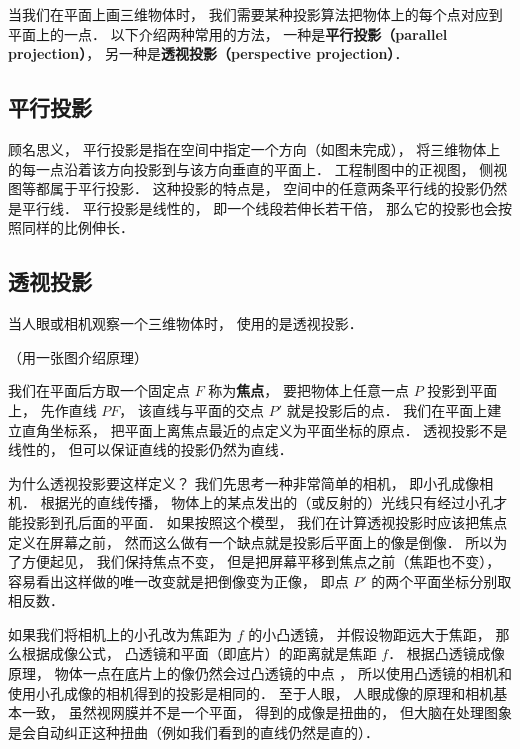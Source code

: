 

当我们在平面上画三维物体时， 我们需要某种投影算法把物体上的每个点对应到平面上的一点． 以下介绍两种常用的方法， 一种是\textbf{平行投影（parallel projection）}， 另一种是\textbf{透视投影（perspective projection）}．


\subsection{平行投影}
顾名思义， 平行投影是指在空间中指定一个方向（如图未完成）， 将三维物体上的每一点沿着该方向投影到与该方向垂直的平面上． 工程制图中的正视图， 侧视图等都属于平行投影． 这种投影的特点是， 空间中的任意两条平行线的投影仍然是平行线． 平行投影是线性的， 即一个线段若伸长若干倍， 那么它的投影也会按照同样的比例伸长．

\subsection{透视投影}
当人眼或相机观察一个三维物体时， 使用的是透视投影．

（用一张图介绍原理）

我们在平面后方取一个固定点 $F$ 称为\textbf{焦点}， 要把物体上任意一点 $P$ 投影到平面上， 先作直线 $PF$， 该直线与平面的交点 $P'$ 就是投影后的点． 我们在平面上建立直角坐标系， 把平面上离焦点最近的点定义为平面坐标的原点． 透视投影不是线性的， 但可以保证直线的投影仍然为直线．

为什么透视投影要这样定义？ 我们先思考一种非常简单的相机， 即小孔成像相机． 根据光的直线传播， 物体上的某点发出的（或反射的）光线只有经过小孔才能投影到孔后面的平面． 如果按照这个模型， 我们在计算透视投影时应该把焦点定义在屏幕之前， 然而这么做有一个缺点就是投影后平面上的像是倒像． 所以为了方便起见， 我们保持焦点不变， 但是把屏幕平移到焦点之前（焦距也不变）， 容易看出这样做的唯一改变就是把倒像变为正像， 即点 $P'$ 的两个平面坐标分别取相反数． %

如果我们将相机上的小孔改为焦距为 $f$ 的小凸透镜， 并假设物距远大于焦距， 那么根据成像公式， 凸透镜和平面（即底片）的距离就是焦距 $f$． 根据凸透镜成像原理， 物体一点在底片上的像仍然会过凸透镜的中点%
， 所以使用凸透镜的相机和使用小孔成像的相机得到的投影是相同的． 至于人眼， 人眼成像的原理和相机基本一致， 虽然视网膜并不是一个平面， 得到的成像是扭曲的， 但大脑在处理图象是会自动纠正这种扭曲（例如我们看到的直线仍然是直的）．

